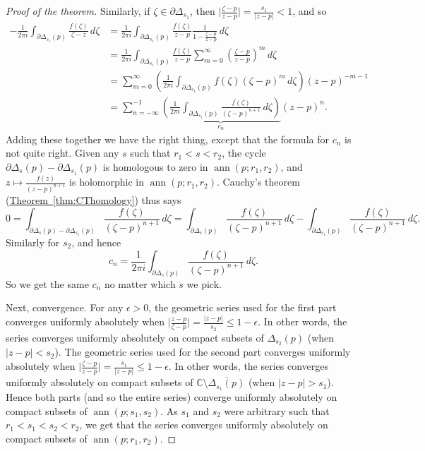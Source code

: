 \documentclass[12pt,openany]{book}
\newcommand{\ann}{\operatorname{ann}}
\newcommand{\sabs}[1]{\lvert {#1} \rvert}
\newcommand{\babs}[1]{\bigl\lvert {#1} \bigr\rvert}
\newcommand{\C}{{\mathbb{C}}}
\theoremstyle{plain}
\theoremstyle{remark}
\theoremstyle{definition}
\theoremstyle{exercise}
\theoremstyle{example}
\newcommand{\thmref}[1]{\hyperref[#1]{Theorem~\ref*{#1}}}
\begin{document}
\begin{proof}[Proof of the theorem]
Similarly, 
if $\zeta \in \partial \Delta_{s_1}$, then
$\babs{\frac{\zeta-p}{z-p}} = \frac{s_1}{\sabs{z-p}} < 1$, and so
\begin{equation*}
\begin{split}
-\frac{1}{2\pi i}
\int_{\partial \Delta_{s_1}(p)} \frac{f(\zeta)}{\zeta-z} \, d\zeta 
& = 
\frac{1}{2\pi i}
\int_{\partial \Delta_{s_1}(p)} \frac{f(\zeta)}{z-p}
\frac{1}{1-\frac{\zeta-p}{z-p}} \, d\zeta
\\
& =
\frac{1}{2\pi i}
\int_{\partial \Delta_{s_1}(p)} \frac{f(\zeta)}{z-p}
\sum_{m=0}^\infty
{\left(\frac{\zeta-p}{z-p}\right)}^m \, d\zeta
\\
& =
\sum_{m=0}^\infty
\left(
\frac{1}{2\pi i}
\int_{\partial \Delta_{s_1}(p)} f(\zeta){(\zeta-p)}^{m}
 \, d\zeta
\right)
{(z-p)}^{-m-1}
\\
& =
\sum_{n=-\infty}^{-1}
\underbrace{
\left(
\frac{1}{2\pi i}
\int_{\partial \Delta_{s_1}(p)} \frac{f(\zeta)}{{(\zeta-p)}^{n+1}}
 \, d\zeta
\right)
}_{c_n}
{(z-p)}^{n} .
\end{split}
\end{equation*}
Adding these together we have the right thing, except that the formula for $c_n$
is not quite right.  Given any $s$ such that
$r_1 < s < r_2$,
the cycle
$\partial \Delta_{s}(p) - \partial \Delta_{s_1}(p)$ is homologous to zero in
$\ann(p;r_1,r_2)$, and 
$z \mapsto \frac{f(z)}{{(z-p)}^{n+1}}$ is holomorphic in 
$\ann(p;r_1,r_2)$.  Cauchy's theorem (\thmref{thm:CThomology}) thus says
\begin{equation*}
0 = \int_{\partial \Delta_{s}(p) - \partial \Delta_{s_1}(p)}
\frac{f(\zeta)}{{(\zeta-p)}^{n+1}} \, d\zeta
=
\int_{\partial \Delta_{s}(p)}
\frac{f(\zeta)}{{(\zeta-p)}^{n+1}} \, d\zeta
-
\int_{\partial \Delta_{s_1}(p)}
\frac{f(\zeta)}{{(\zeta-p)}^{n+1}} \, d\zeta .
\end{equation*}
Similarly for $s_2$, and hence
\begin{equation*}
c_n = \frac{1}{2\pi i}
\int_{\partial \Delta_{s}(p)} \frac{f(\zeta)}{{(\zeta-p)}^{n+1}}
 \, d\zeta .
\end{equation*}
So we get the same $c_n$ no matter which $s$ we pick.

Next, convergence.
For any $\epsilon > 0$,
the geometric series used for the first part converges uniformly
absolutely when $\babs{\frac{z-p}{\zeta-p}} = \frac{\sabs{z-p}}{s_2} \leq
1-\epsilon$.  In other words, the series converges uniformly absolutely
on compact subsets of $\Delta_{s_2}(p)$ (when $\sabs{z-p} < s_2$).
%
The geometric series used for the second part converges uniformly
absolutely when $\babs{\frac{\zeta-p}{z-p}} = \frac{s_1}{\sabs{z-p}} \leq
1-\epsilon$.  In other words, the series converges uniformly absolutely
on compact subsets of $\C \setminus \overline{\Delta_{s_1}(p)}$
(when $\sabs{z-p} > s_1$).
Hence both parts (and so the entire series) 
converge uniformly absolutely on compact
subsets of $\ann(p;s_1,s_2)$.  As $s_1$ and $s_2$ were arbitrary such that
$r_1 < s_1 < s_2 < r_2$, we get that the series
converges uniformly absolutely on compact subsets of $\ann(p;r_1,r_2)$.


\end{proof}
\end{document}
